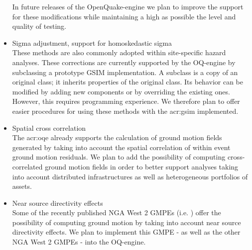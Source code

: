 \begin{itemize}
        In future releases of the OpenQuake-engine we plan to improve the
        support for these modifications while maintaining a high as possible 
        the level and quality of testing.
    \item Sigma adjustment, support for homoskedastic sigma \hfill \\ 
        These methods are also commonly adopted within site-specific
        hazard analyses.
        These corrections are currently supported by the OQ-engine by 
        subclassing a prototype GSIM implementation. A subclass is a copy of
        an original class; it inherits properties of the original class. Its 
        behavior can be modified by adding new components or by overriding 
        the existing ones. 
        However, this requires programming experience. We therefore plan to 
        offer easier procedures for using these methods with the \gls{acr:gsim}
        implemented.
    \item Spatial cross correlation \hfill \\
        The \gls{acr:oqe} already supports the calculation of ground motion
        fields generated by taking into account the spatial correlation of
        within event ground motion residuals.
        We plan to add the possibility of computing cross-correlated ground 
        motion fields in order to better support analyses taking into account 
        distributed infrastructures as well as heterogeneous portfolios of 
        assets. 
    \item Near source directivity effects \hfill \\
        Some of the recently published NGA West 2 GMPEs (i.e.
        \textcite{chiou2014}) offer the possibility of computing ground motion
        by taking into account near source directivity effects. We plan to
        implement this GMPE - as well as the other NGA West 2 GMPEs - into the
        OQ-engine.  
\end{itemize}
